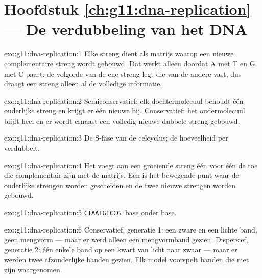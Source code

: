 \section*{Hoofdstuk \ref{ch:g11:dna-replication} --- De verdubbeling van het DNA}

\begin{solution}{exo:g11:dna-replication:1}
Elke streng dient als matrijs waarop een nieuwe complementaire streng
wordt gebouwd. Dat werkt alleen doordat A met T en G met C paart: de
volgorde van de ene streng legt die van de andere vast, dus draagt een
streng alleen al de volledige informatie.
\end{solution}

\begin{solution}{exo:g11:dna-replication:2}
Semiconservatief: elk dochtermolecuul behoudt één ouderlijke streng en
krijgt er één nieuwe bij. Conservatief: het oudermolecuul blijft heel en
er wordt ernaast een volledig nieuwe dubbele streng gebouwd.
\end{solution}

\begin{solution}{exo:g11:dna-replication:3}
De S-fase van de celcyclus; de hoeveelheid  per  verdubbelt.
\end{solution}

\begin{solution}{exo:g11:dna-replication:4}
Het  voegt aan een groeiende streng één voor één de
 toe die complementair zijn met de matrijs. Een
 is het bewegende punt waar de ouderlijke strengen worden
gescheiden en de twee nieuwe strengen worden gebouwd.
\end{solution}

\begin{solution}{exo:g11:dna-replication:5}
\texttt{CTAATGTCCG}, base onder base.
\end{solution}

\begin{solution}{exo:g11:dna-replication:6}
Conservatief, generatie 1: een zware en een lichte band, geen mengvorm
--- maar er werd alleen een mengvormband gezien. Dispersief, generatie 2:
één enkele band op een kwart van licht naar zwaar --- maar er werden twee
afzonderlijke banden gezien. Elk model voorspelt banden die niet zijn
waargenomen.
\end{solution}

